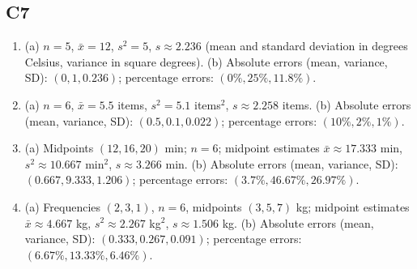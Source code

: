 {\subsection*{C7}
\begin{enumerate}[label=\textbf{C7.\arabic*.}]
\item (a) $n=5$, $\bar{x}=12$, $s^2=5$, $s\approx2.236$
(mean and standard deviation in degrees Celsius, variance in square degrees).
(b) Absolute errors (mean, variance, SD): $(0,1,0.236)$; percentage errors: $(0\%,25\%,11.8\%)$.
\item (a) $n=6$, $\bar{x}=5.5$ items, $s^2=5.1$ items$^2$,
$s\approx2.258$ items.
(b) Absolute errors (mean, variance, SD): $(0.5,0.1,0.022)$; percentage errors: $(10\%,2\%,1\%)$.
\item (a) Midpoints $(12,16,20)$ min; $n=6$; midpoint estimates
$\bar{x}\approx17.333$ min, $s^2\approx10.667$ min$^2$,
$s\approx3.266$ min.
(b) Absolute errors (mean, variance, SD): $(0.667,9.333,1.206)$; percentage errors: $(3.7\%,46.67\%,26.97\%)$.
\item (a) Frequencies $(2,3,1)$, $n=6$, midpoints $(3,5,7)$ kg;
midpoint estimates $\bar{x}\approx4.667$ kg, $s^2\approx2.267$ kg$^2$,
$s\approx1.506$ kg.
(b) Absolute errors (mean, variance, SD): $(0.333,0.267,0.091)$; percentage errors: $(6.67\%,13.33\%,6.46\%)$.
\end{enumerate}
}


